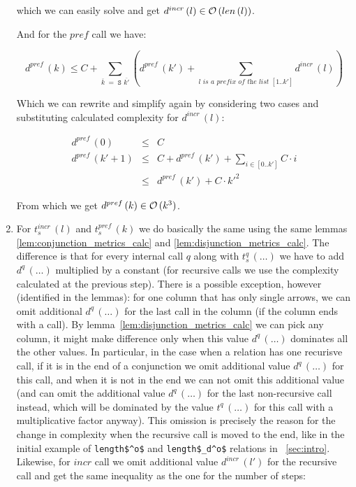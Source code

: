 \begin{enumerate}
which we can easily solve and get $d^{incr}\,(l) \in \mathcal{O}\,(len\,(l))$.

And for the $pref$ call we have:

\[ d^{pref}\,(k) \le C + \sum_{\overline{k} \;=\; \texttt{S $\overline{k'}$}} (d^{pref}\,(k') + \sum_{\textit{$l$ is a prefix of the list $[1..k']$}} d^{incr}\,(l)) \]

Which we can rewrite and simplify again by considering two cases and substituting calculated complexity for $d^{incr}\,(l)$:

\[
\begin{array}{lcl}
d^{pref}\,(0) &\le& C \\
d^{pref}\,(k' + 1) &\le& C + d^{pref}\,(k') + \sum_{i \in [0..k']} C \cdot i \\
            &\le& d^{pref}\,(k') + C \cdot k'^2 
\end{array} \]

From which we get $d^{pref}\,(k) \in \mathcal{O}\,(k^3)$.

\item For $t_s^{incr}\,(l)$ and $t_s^{pref}\,(k)$ we do basically the same using the same lemmas \ref{lem:conjunction_metrics_calc} and \ref{lem:disjunction_metrics_calc}. The difference is that for every internal call $q$ along with $t_s^q\,(\dots)$ we have to add $d^q\,(\dots)$
  multiplied by a constant (for recursive calls we use the complexity calculated at the previous step). There is a possible exception, however (identified in the lemmas): for one column that has only single arrows, we can omit additional $d^q\,(\dots)$ for the last call in the column (if the column ends with a call).
  By lemma~\ref{lem:disjunction_metrics_calc} we can pick any column, it might make difference only when this value $d^q\,(\dots)$ dominates all the other values. In particular, in the case when a relation has one recurisve call, if it is in the end of a conjunction we omit additional value $d^q\,(\dots)$ for this call, and when it is not in the end we can not omit this additional value (and can omit the additional value $d^q\,(\dots)$ for the last non-recursive call instead, which will be dominated by the value $t^q\,(\dots)$ for this call with a multiplicative factor anyway). This omission is precisely the reason for the change in complexity when the recursive call is moved to the end, like in the initial example of \lstinline|length$^o$| and \lstinline|length$_d^o$| relations in \sectionword~\ref{sec:intro}. Likewise, for $incr$ call we omit additional value $d^{incr}\,(l')$ for the recursive call and get the same inequality as the one for the number of steps:


\end{enumerate}
